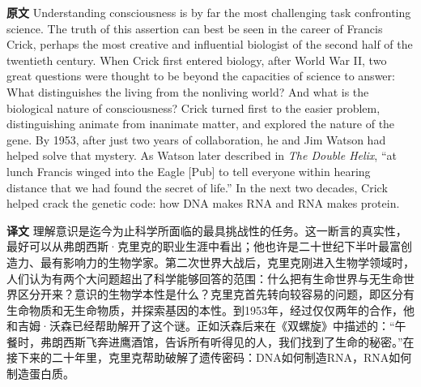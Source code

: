 \documentclass[UTF8,zihao=-4]{ctexart}
\newcommand{\BodyFont}{\fontsize{10.5pt}{15.5pt}\selectfont}
\newcommand{\origlabel}{\textbf{原文}\quad}
\newcommand{\translabel}{\textbf{译文}\quad}
\newenvironment{enblock}{\par\noindent\begingroup\BodyFont\origlabel}{\par\endgroup}
\newenvironment{zhblock}{\par\noindent\begingroup\BodyFont\translabel}{\par\endgroup\vspace{0.35em}}
\begin{document}
\begin{enblock}
Understanding consciousness is by far the most challenging task confronting science. The truth of this assertion can best be seen in the career of Francis Crick, perhaps the most creative and influential biologist of the second half of the twentieth century. When Crick first entered biology, after World War II, two great questions were thought to be beyond the capacities of science to answer: What distinguishes the living from the nonliving world? And what is the biological nature of consciousness? Crick turned first to the easier problem, distinguishing animate from inanimate matter, and explored the nature of the gene. By 1953, after just two years of collaboration, he and Jim Watson had helped solve that mystery. As Watson later described in \emph{The Double Helix}, “at lunch Francis winged into the Eagle [Pub] to tell everyone within hearing distance that we had found the secret of life.” In the next two decades, Crick helped crack the genetic code: how DNA makes RNA and RNA makes protein.
\end{enblock}
\begin{zhblock}
理解意识是迄今为止科学所面临的最具挑战性的任务。这一断言的真实性，最好可以从弗朗西斯·克里克的职业生涯中看出；他也许是二十世纪下半叶最富创造力、最有影响力的生物学家。第二次世界大战后，克里克刚进入生物学领域时，人们认为有两个大问题超出了科学能够回答的范围：什么把有生命世界与无生命世界区分开来？意识的生物学本性是什么？克里克首先转向较容易的问题，即区分有生命物质和无生命物质，并探索基因的本性。到1953年，经过仅仅两年的合作，他和吉姆·沃森已经帮助解开了这个谜。正如沃森后来在《双螺旋》中描述的：“午餐时，弗朗西斯飞奔进鹰酒馆，告诉所有听得见的人，我们找到了生命的秘密。”在接下来的二十年里，克里克帮助破解了遗传密码：DNA如何制造RNA，RNA如何制造蛋白质。\end{zhblock}
\end{document}

